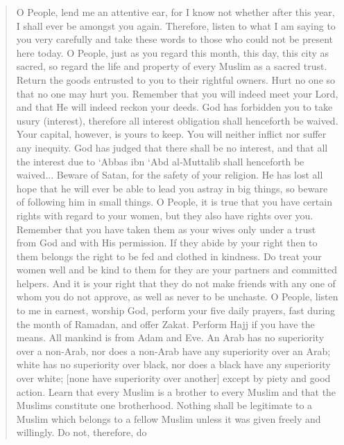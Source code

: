 \documentclass[fontsize=14pt, letterpaper, notitlepage, openany, DIV=12]{scrbook} %
\begin{document}
\begin{quotation}
  O People, lend me an attentive ear, for I know not whether after this year, I shall ever be
  amongst you again. Therefore, listen to what I am saying to you very carefully and take
  these words to those who could not be present here today. O People, just as you regard
  this month, this day, this city as sacred, so regard the life and property of every Muslim
  as a sacred trust. Return the goods entrusted to you to their rightful owners. Hurt no one
  so that no one may hurt you. Remember that you will indeed meet your Lord, and that He
  will indeed reckon your deeds. God has forbidden you to take usury (interest), therefore
  all interest obligation shall henceforth be waived. Your capital, however, is yours to keep.
  You will neither inflict nor suffer any inequity. God has judged that there shall be no
  interest, and that all the interest due to `Abbas ibn `Abd al‐Muttalib shall henceforth be
  waived... Beware of Satan, for the safety of your religion. He has lost all hope that he will
  ever be able to lead you astray in big things, so beware of following him in small things.
  O People, it is true that you have certain rights with regard to your women, but they also
  have rights over you. Remember that you have taken them as your wives only under a
  trust from God and with His permission. If they abide by your right then to them belongs
  the right to be fed and clothed in kindness. Do treat your women well and be kind to them
  for they are your partners and committed helpers. And it is your right that they do not
  make friends with any one of whom you do not approve, as well as never to be unchaste.
  O People, listen to me in earnest, worship God, perform your five daily prayers, fast
  during the month of Ramadan, and offer Zakat. Perform Hajj if you have the means. All
  mankind is from Adam and Eve. An Arab has no superiority over a non‐Arab, nor does a
  non‐Arab have any superiority over an Arab; white has no superiority over black, nor
  does a black have any superiority over white; [none have superiority over another] except
  by piety and good action. Learn that every Muslim is a brother to every Muslim and that
  the Muslims constitute one brotherhood. Nothing shall be legitimate to a Muslim which
  belongs to a fellow Muslim unless it was given freely and willingly. Do not, therefore, do

\end{quotation}
\end{document}
